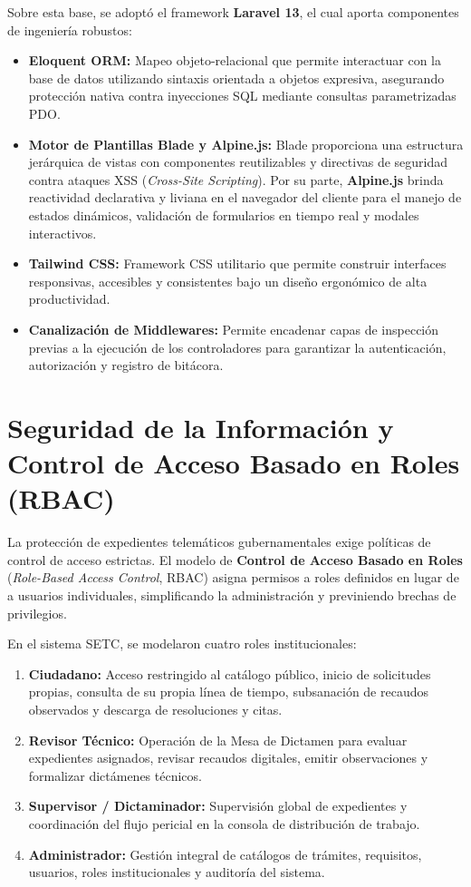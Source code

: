Sobre esta base, se adoptó el framework \textbf{Laravel 13}, el cual aporta componentes de ingeniería robustos:

\begin{itemize}
    \item \textbf{Eloquent ORM:} Mapeo objeto-relacional que permite interactuar con la base de datos utilizando sintaxis orientada a objetos expresiva, asegurando protección nativa contra inyecciones SQL mediante consultas parametrizadas PDO.
    \item \textbf{Motor de Plantillas Blade y Alpine.js:} Blade proporciona una estructura jerárquica de vistas con componentes reutilizables y directivas de seguridad contra ataques XSS (\textit{Cross-Site Scripting}). Por su parte, \textbf{Alpine.js} brinda reactividad declarativa y liviana en el navegador del cliente para el manejo de estados dinámicos, validación de formularios en tiempo real y modales interactivos.
    \item \textbf{Tailwind CSS:} Framework CSS utilitario que permite construir interfaces responsivas, accesibles y consistentes bajo un diseño ergonómico de alta productividad.
    \item \textbf{Canalización de Middlewares:} Permite encadenar capas de inspección previas a la ejecución de los controladores para garantizar la autenticación, autorización y registro de bitácora.
\end{itemize}

\section{Seguridad de la Información y Control de Acceso Basado en Roles (RBAC)}

La protección de expedientes telemáticos gubernamentales exige políticas de control de acceso estrictas. El modelo de \textbf{Control de Acceso Basado en Roles} (\textit{Role-Based Access Control}, RBAC) asigna permisos a roles definidos en lugar de a usuarios individuales, simplificando la administración y previniendo brechas de privilegios.

En el sistema SETC, se modelaron cuatro roles institucionales:
\begin{enumerate}
    \item \textbf{Ciudadano:} Acceso restringido al catálogo público, inicio de solicitudes propias, consulta de su propia línea de tiempo, subsanación de recaudos observados y descarga de resoluciones y citas.
    \item \textbf{Revisor Técnico:} Operación de la Mesa de Dictamen para evaluar expedientes asignados, revisar recaudos digitales, emitir observaciones y formalizar dictámenes técnicos.
    \item \textbf{Supervisor / Dictaminador:} Supervisión global de expedientes y coordinación del flujo pericial en la consola de distribución de trabajo.
    \item \textbf{Administrador:} Gestión integral de catálogos de trámites, requisitos, usuarios, roles institucionales y auditoría del sistema.
\end{enumerate}

